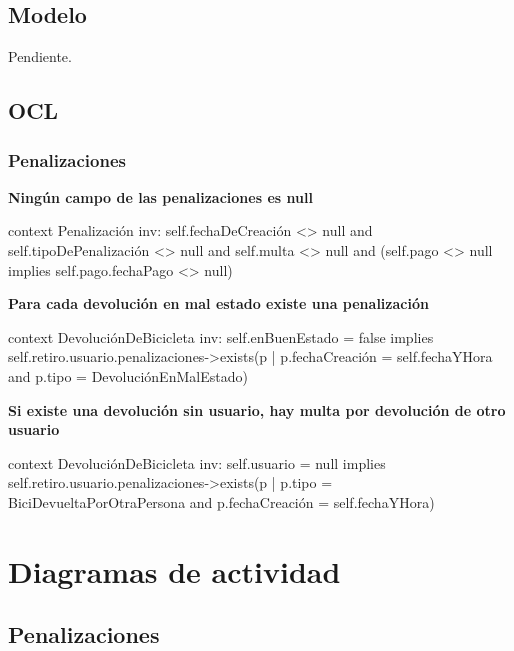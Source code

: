 \documentclass[a4paper, 10pt, twoside]{article}
\newenvironment{ocl}[1]
  {
    \textbf{#1}
    \verbatim
  }{
    \endverbatim
  }
\begin{document}
\subsection{Modelo}

Pendiente.


\subsection{OCL}


\subsubsection{Penalizaciones}

\begin{ocl}{Ningún campo de las penalizaciones es null}
  context Penalización
  inv: self.fechaDeCreación <> null and
       self.tipoDePenalización <> null and
       self.multa <> null and
       (self.pago <> null implies self.pago.fechaPago <> null)
\end{ocl}

\begin{ocl}{Para cada devolución en mal estado existe una penalización}
  context DevoluciónDeBicicleta
  inv: self.enBuenEstado = false implies
           self.retiro.usuario.penalizaciones->exists(p |
               p.fechaCreación = self.fechaYHora and
               p.tipo = DevoluciónEnMalEstado)
\end{ocl}

\begin{ocl}{Si existe una devolución sin usuario, hay multa por devolución de otro usuario}
  context DevoluciónDeBicicleta
  inv: self.usuario = null implies
           self.retiro.usuario.penalizaciones->exists(p |
               p.tipo = BiciDevueltaPorOtraPersona and
               p.fechaCreación = self.fechaYHora)
\end{ocl}



\section{Diagramas de actividad}

\subsection{Penalizaciones}
\end{document}
